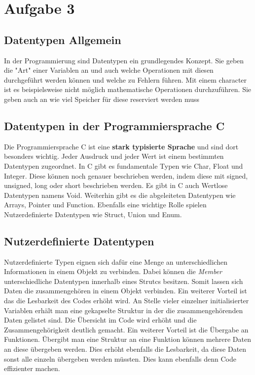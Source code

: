 \chapter{Aufgabe 3}
\section{Datentypen Allgemein}
In der Programmierung sind Datentypen ein grundlegendes Konzept.
Sie geben die "Art" einer Variablen an und auch welche Operationen mit diesen durchgeführt werden können und welche zu Fehlern führen.
Mit einem character ist es beispielsweise nicht möglich mathematische Operationen durchzuführen.
Sie geben auch an wie viel Speicher für diese reserviert werden muss\cite{datentypen:2022} 

\section{Datentypen in der Programmiersprache C}
Die Programmiersprache C ist eine \textbf{stark typisierte Sprache} und sind dort besonders wichtig.
Jeder Ausdruck und jeder Wert ist einem bestimmten Datentypen zugeordnet.
In C gibt es fundamentale Typen wie Char, Float und Integer.
Diese können noch genauer beschrieben werden, indem diese mit signed, unsigned, long oder short beschrieben werden.
Es gibt in C auch Wertlose Datentypen namens Void.
Weiterhin gibt es die abgeleiteten Datentypen wie Arrays, Pointer und Function.
Ebenfalls eine wichtige Rolle spielen Nutzerdefinierte Datentypen wie Struct, Union und Enum\cite{bökelmann:2023}.

\section{Nutzerdefinierte Datentypen}
Nutzerdefinierte Typen eignen sich dafür eine Menge an unterschiedlichen Informationen in einem Objekt zu verbinden.
Dabei können die \textit{Member} unterschiedliche Datentypen innerhalb eines Strutcs besitzen\cite{bökelmann:2023}.
Somit lassen sich Daten die zusammengehören in einem Objekt verbinden.
Ein weiterer Vorteil ist das die Lesbarkeit des Codes erhöht wird.
An Stelle vieler einzelner initialisierter Variablen erhält man eine gekapselte Struktur in der die zusammengehörenden Daten gelistet sind.
Die Übersicht im Code wird erhöht und die Zusammengehörigkeit deutlich gemacht.
Ein weiterer Vorteil ist die Übergabe an Funktionen.
Übergibt man eine Struktur an eine Funktion können mehrere Daten an diese übergeben werden.
Dies erhöht ebenfalls die Lesbarkeit, da diese Daten sonst alle einzeln übergeben werden müssten.
Dies kann ebenfalls denn Code effizienter machen.

